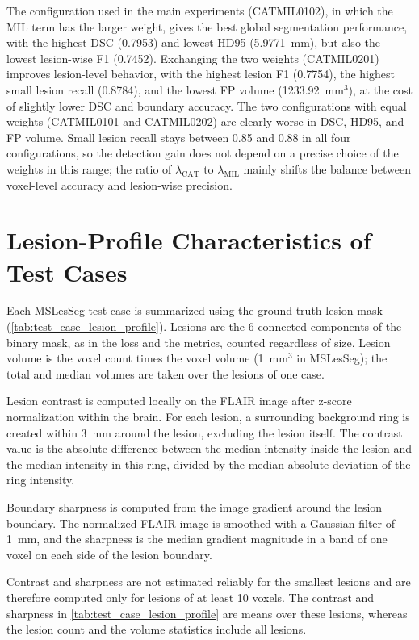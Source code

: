 The configuration used in the main experiments (CATMIL0102), in which the
MIL term has the larger weight, gives the best global segmentation
performance, with the highest DSC (0.7953) and lowest HD95 (5.9771~mm), but
also the lowest lesion-wise F1 (0.7452). Exchanging the two weights
(CATMIL0201) improves lesion-level behavior, with the highest lesion F1
(0.7754), the highest small lesion recall (0.8784), and the lowest FP
volume (1233.92~mm$^3$), at the cost of slightly lower DSC and boundary
accuracy. The two configurations with equal weights (CATMIL0101 and
CATMIL0202) are clearly worse in DSC, HD95, and FP volume. Small lesion
recall stays between 0.85 and 0.88 in all four configurations, so the
detection gain does not depend on a precise choice of the weights in this
range; the ratio of $\lambda_{\text{CAT}}$ to $\lambda_{\text{MIL}}$ mainly
shifts the balance between voxel-level accuracy and lesion-wise precision.

\section{Lesion-Profile Characteristics of Test Cases}
\label{appendix:test-case-lesion-profile}

Each MSLesSeg test case is summarized using the ground-truth lesion mask
(\cref{tab:test_case_lesion_profile}). Lesions are the 6-connected
components of the binary mask, as in the loss and the metrics, counted
regardless of size. Lesion volume is the voxel count times the voxel volume
(1~mm$^3$ in MSLesSeg); the total and median volumes are taken over the
lesions of one case.

Lesion contrast is computed locally on the FLAIR image after z-score
normalization within the brain. For each lesion, a surrounding background
ring is created within 3~mm around the lesion, excluding the lesion itself.
The contrast value is the absolute difference between the median intensity
inside the lesion and the median intensity in this ring, divided by the
median absolute deviation of the ring intensity.

Boundary sharpness is computed from the image gradient around the lesion
boundary. The normalized FLAIR image is smoothed with a Gaussian filter of
1~mm, and the sharpness is the median gradient magnitude in a band of one
voxel on each side of the lesion boundary.

Contrast and sharpness are not estimated reliably for the smallest lesions
and are therefore computed only for lesions of at least 10 voxels. The
contrast and sharpness in \cref{tab:test_case_lesion_profile} are means
over these lesions, whereas the lesion count and the volume statistics
include all lesions.

